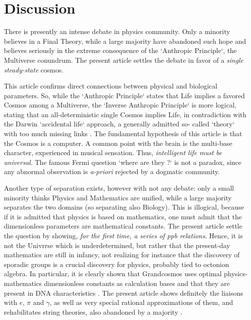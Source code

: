 \documentclass[twoside,draft]{article}
\begin{document}
\begin{sloppypar}
\section {Discussion}

There is presently an intense debate in physics community. Only a minority believes in a 
Final Theory, while a large majority have abandoned such hope and believes seriously in the extreme
consequence of the `Anthropic Principle`, the Multiverse conundrum. The present article settles the
debate in favor of a \textit{single steady-state} cosmos.

This article confirms direct connections \cite{Sanchez1} between physical and biological parameters. So,
while the `Anthropic Principle` states that Life implies a favored Cosmos among a Multiverse, the
`Inverse Anthropic Principle` is more logical, stating that an all-deterministic single Cosmos
implies Life, in contradiction with the Darwin `accidental life` approach, a generally admitted so-
called `theory` with too much missing links \cite{Chauvin}. The fundamental hypothesis of
this article is that the Cosmos is a computer. A common point with the brain is the multi-base
character, experienced in musical sensation. Thus, \textit{intelligent life must be universal}. The famous Fermi
question `where are they ?` is not a paradox, since any abnormal observation is \textit{a-priori} rejected by a
dogmatic community.

Another type of separation exists, however with not any debate: only a small minority thinks Physics
and Mathematics are unified, while a large majority separates the two domains (so separating also
Biology). This is illogical, because if it is admitted that physics is based on mathematics, one must admit that the dimensionless parameters are mathematical constants. The present article settle the question by showing, \textit{for the first time, a series of ppb relations}. Hence, it is not the Univrrse which is underdetermined, but rather that the present-day mathematics are still in infancy, not realizing for instance that the discovery of sporadic groups is a crucial discovery for physics, probably tied to octonion algebra. In particular, it is clearly shown that Grandcosmos uses optimal physics-mathematics dimensionless constants as
calculation bases and that they are present in DNA characteristics \cite{Sanchez1}. The present article shows
definitely the liaisons with $e$, $\pi$ and $\gamma$, as well as very special rational approximations of 
them, and rehabilitates string theories, also abandoned by a majority \cite{Woit}.


\end{sloppypar}
\end{document}
